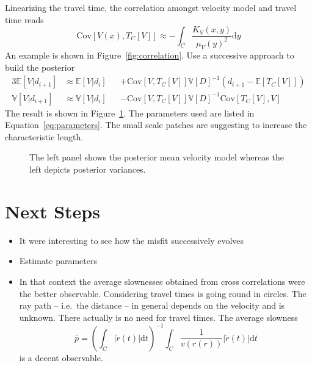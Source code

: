 \documentclass[11pt]{article}
\newcommand\Mean[1]{\mathbb{E}\!\left[#1\right]}
\newcommand\Var[1]{\mathbb{V}\!\left[#1\right]}
\newcommand\Cov[2]{\mathrm{Cov}\!\left[#1,#2\right]}
\begin{document}
Linearizing the travel time, the correlation amongst velocity model and travel time reads
\begin{equation}
    \Cov{V(x)}{T_C[V]} \approx -\int_C \frac{K_V(x,y)}{\mu_V(y)^2}  \mathrm d y
\end{equation}
An example is shown in Figure~\ref{fig:correlation}.
Use a successive approach to build the posterior
\begin{alignat}{3}
    \Mean{V|d_{i+1}} &\approx \Mean{V|d_i} &&+ \Cov{V}{T_C[V]}\Var{D}^{-1} \left(d_{i+1}-\Mean{T_C[V]}\right)
    \\
    \Var{V|d_{i+1}}  &\approx \Var{V|d_i}  &&- \Cov{V}{T_C[V]}\Var{D}^{-1}  \Cov{T_C[V]}{V}
\end{alignat}
The result is shown in Figure~\ref{fig:example}. The parameters used are listed in Equation~\ref{eq:parameters}.
The small scale patches are suggesting to increase the characteristic length.

\begin{figure}
    \centering
    
    \caption{The left panel shows the posterior mean velocity model whereas the left depicts posterior variances. }
    \label{fig:example}
\end{figure}


\section{Next Steps}

\begin{itemize}
    \item It were interesting to see how the misfit successively evolves
    \item Estimate parameters
    \item In that context the average slownesses obtained from cross correlations were the better observable.
        Considering travel times is going round in circles.
        The ray path -- i.e.~the distance -- in general depends on the velocity and is unknown.
        There actually is no need for travel times.
        The average slowness
        \begin{equation}
            \bar p = \left(\int_C |\acute r(t)| \mathrm d t \right)^{-1} \int_C \frac 1 {v(r(r))} |\acute r(t)| \mathrm d t
        \end{equation}
        is a decent observable.

\end{itemize}
\end{document}
